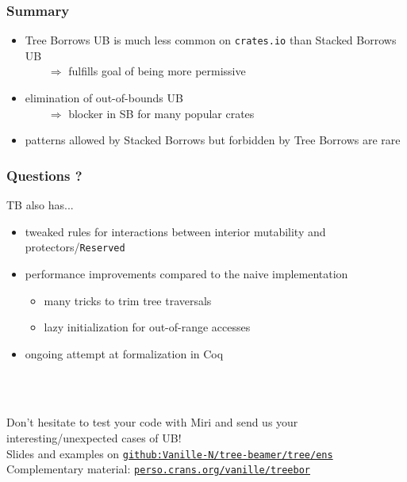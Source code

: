 \begin{frame}
    \frametitle{Summary}
    \begin{itemize}
        \item Tree Borrows UB is much less common on \texttt{crates.io} than Stacked Borrows UB\\
            \(\qquad\Rightarrow\) fulfills goal of being more permissive
        \item elimination of out-of-bounds UB\\
            \(\qquad\Rightarrow\) blocker in SB for many popular crates
        \item patterns allowed by Stacked Borrows but forbidden by Tree Borrows are rare
    \end{itemize}
\end{frame}

\begin{frame}
    \frametitle{Questions ?}

    TB also has...
    \begin{itemize}
        \item tweaked rules for interactions between interior mutability and protectors/\texttt{Reserved}
        \item performance improvements compared to the naive implementation
            \begin{itemize}
                \item many tricks to trim tree traversals
                \item lazy initialization for out-of-range accesses
            \end{itemize}
        \item ongoing attempt at formalization in Coq
    \end{itemize}~\\~\\
    \vfill

    Don't hesitate to test your code with Miri and send us your interesting/unexpected cases of UB!\\
    Slides and examples on \href{https://github.com/Vanille-N/tree-beamer/tree/ens}{\texttt{github:Vanille-N/tree-beamer/tree/ens}}\\
    Complementary material: \href{https://perso.crans.org/vanille/treebor}{\texttt{perso.crans.org/vanille/treebor}}\\
\end{frame}
